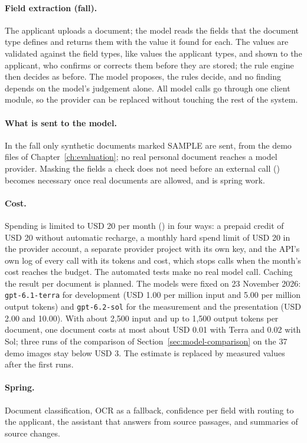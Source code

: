 \paragraph{Field extraction (fall).} The applicant uploads a document; the model reads the fields
that the document type defines and returns them with the value it found for each. The values are
validated against the field types, like values the applicant types, and shown to the applicant, who confirms or
corrects them before they are stored; the rule engine then decides as before. The model proposes,
the rules decide, and no finding depends on the model's judgement alone. All model calls go
through one client module, so the provider can be replaced without touching the rest of the
system.

\paragraph{What is sent to the model.} In the fall only synthetic documents marked SAMPLE are
sent, from the demo files of Chapter~\ref{ch:evaluation}; no real personal document reaches a
model provider. Masking the fields a check does not need before an external call
() becomes necessary once real documents are allowed, and is spring work.

\paragraph{Cost.} Spending is limited to USD 20 per month () in four ways: a
prepaid credit of USD 20 without automatic recharge, a monthly hard spend limit of USD 20 in the
provider account, a separate provider project with its own key, and the API's own log of every
call with its tokens and cost, which stops calls when the month's cost reaches the budget. The
automated tests make no real model call. Caching the result per document is planned. The models
were fixed on 23 November 2026: \texttt{gpt-6.1-terra} for development (USD 1.00 per million input
and 5.00 per million output tokens) and \texttt{gpt-6.2-sol} for the measurement and the
presentation (USD 2.00 and 10.00). With about 2,500 input and up to 1,500 output tokens per
document, one document costs at most about USD 0.01 with Terra and 0.02 with Sol; three runs of
the comparison of Section~\ref{sec:model-comparison} on the 37 demo images stay below USD 3. The
estimate is replaced by measured values after the first runs.

\paragraph{Spring.} Document classification, OCR as a fallback, confidence per field with
routing to the applicant, the assistant that answers from source passages, and summaries of
source changes.
